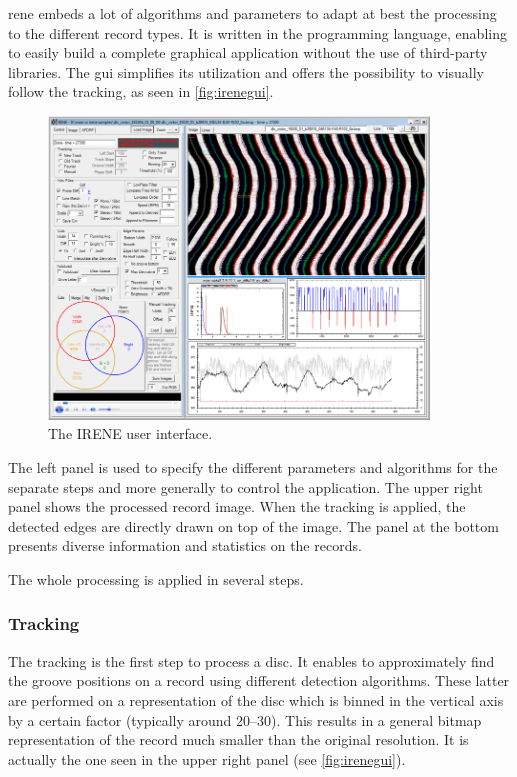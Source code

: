 \gls{rene} embeds a lot of algorithms and parameters to adapt at best the processing to the different record types. It is written in the \Csh{} programming language, enabling to easily build a complete graphical application without the use of third-party libraries. The \gls{gui} simplifies its utilization and offers the possibility to visually follow the tracking, as seen in \autoref{fig:irenegui}.

\begin{figure}[!ht]
\centering
\includegraphics[width=0.9\textwidth]{images/rene-gui}
\caption{The IRENE user interface.}
\label{fig:irenegui}
\end{figure}

The left panel is used to specify the different parameters and algorithms for the separate steps and more generally to control the application. The upper right panel shows the processed record image. When the tracking is applied, the detected edges are directly drawn on top of the image. The panel at the bottom presents diverse information and statistics on the records.

The whole processing is applied in several steps.

\subsubsection{Tracking}

The tracking is the first step to process a disc. It enables to approximately find the groove positions on a record using different detection algorithms. These latter are performed on a representation of the disc which is binned in the vertical axis by a certain factor (typically around \numrange[range-phrase=--]{20}{30}). This results in a general bitmap representation of the record much smaller than the original resolution. It is actually the one seen in the upper right panel (see \autoref{fig:irenegui}).

